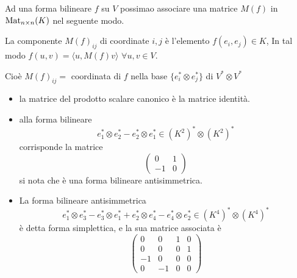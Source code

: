 \documentclass[../main.tex]{subfiles}
\begin{document}
Ad una forma bilineare $f$ su $V$ possimao associare una matrice $M(f)$ in $\operatorname{Mat}_{n \times n}(K)$ nel seguente modo.

La componente $M(f)_{ij}$ di coordinate $i, j$ è l'elemento $f(e_i, e_j) \in K$, In tal modo $f(u, v) = \langle u, M(f)v\rangle$ $\forall u, v \in V$.

Cioè $M(f)_{ij} =$ coordinata di $f$ nella base $\{e_i^* \otimes e_j^*\}$ di $V^* \otimes V^*$

\begin{example}
    \begin{itemize}
        \item la matrice del prodotto scalare canonico è la matrice identità.
        \item alla forma bilineare
              \begin{equation*}
                  e_1^* \otimes e_2^* - e_2^* \otimes e_1^* \in (K^2)^* \otimes (K^2)^*
              \end{equation*}
              corrisponde la matrice
              \begin{equation*}
                  \begin{pmatrix}
                      0  & 1 \\
                      -1 & 0
                  \end{pmatrix}
              \end{equation*}
              si nota che è una forma bilineare antisimmetrica.
        \item La forma bilineare antisimmetrica
              \begin{equation*}
                  e_1^* \otimes e_3^* - e_3^* \otimes e_1^* + e_2^* \otimes e_4^* - e_4^* \otimes e_2^* \in (K^4)^* \otimes (K^4)^*
              \end{equation*}
              è detta forma simplettica, e la sua matrice associata è
              \begin{equation*}
                  \begin{pmatrix}
                      0  & 0  & 1 & 0 \\
                      0  & 0  & 0 & 1 \\
                      -1 & 0  & 0 & 0 \\
                      0  & -1 & 0 & 0
                  \end{pmatrix}
              \end{equation*}
    \end{itemize}
\end{example}
\end{document}
